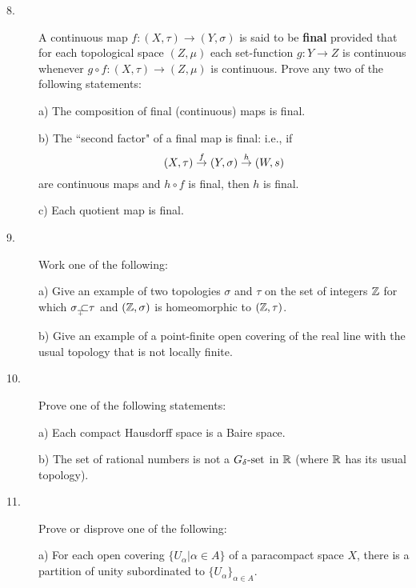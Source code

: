 \documentclass[bbb]{report}
\def\R{{\Bbb R}}
\begin{document}
\begin{Large}
\begin{description}


\item[8.]
A continuous map $f:(X,\tau)\to (Y,\sigma)$ is said to be {\bf final}
provided that for each topological space $(Z,\mu)$ each set-function
$g:Y\to Z$ is continuous whenever $g\circ f:(X,\tau)\to (Z,\mu)$
is continuous. Prove any two of the following statements:

\item[\quad] a)
The composition of final (continuous) maps is final.

\item[\quad] b)
The ``second factor" of a final map is final: i.e., if
$$(X,\tau)\buildrel{f}\over{\to} (Y,\sigma)\buildrel{h}\over{\to}(W,s)$$
are continuous maps and $h\circ f$ is final, then $h$ is final.

\item[\quad] c)
Each quotient map is final.


\item[9.]
Work one of the following:

\item[\quad] a)
Give an example of two topologies $\sigma$ and $\tau$ on the
set of integers $\Bbb Z$ for which $\sigma
\subset_\subplus\tau$ and
$({\Bbb Z},\sigma)$ is homeomorphic to $({\Bbb Z},\tau)$.

\item[\quad] b)
Give an example of a point-finite open covering of the real line
with the usual topology that is not locally finite.


\item[10.]
Prove one of the following statements:

\item[\quad] a)
Each compact Hausdorff space is a Baire space.

\item[\quad] b)
The set of rational numbers is not a $G_\delta\hbox{-set}$ in $\R$
(where $\R$ has its usual topology).

\vfill\eject

\item[11.]
Prove or disprove one of the following:

\item[\quad] a)
For each open covering $\{U_\alpha|\alpha\in A\}$ of a paracompact space $X$,
there is a partition of unity subordinated to $\{U_\alpha\}_{\alpha\in A}$.


\end{description}
\end{Large}
\end{document}
